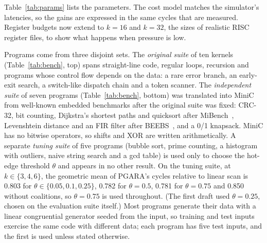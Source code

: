 \documentclass{ieeeaccess}
\newcommand{\MG}{PGARA}
\begin{document}
Table~\ref{tab:params} lists the parameters. The cost model matches the
simulator's latencies, so the gains are expressed in the same cycles
that are measured. Register budgets now extend to $k=16$ and $k=32$,
the sizes of realistic RISC register files, to show what happens when
pressure is low.

Programs come from three disjoint sets. The \emph{original suite} of
ten kernels (Table~\ref{tab:bench}, top) spans straight-line code,
regular loops, recursion and programs whose control flow depends on the
data: a rare error branch, an early-exit search, a switch-like dispatch
chain and a token scanner. The \emph{independent suite} of seven
programs (Table~\ref{tab:bench}, bottom) was translated into MiniC from
well-known embedded benchmarks after the original suite was fixed:
CRC-32, bit counting, Dijkstra's shortest paths and quicksort after
MiBench~\cite{guthaus2001mibench}, Levenshtein distance and an FIR
filter after BEEBS~\cite{pallister2013beebs}, and a 0/1 knapsack.
MiniC has no bitwise operators, so shifts and XOR are written
arithmetically. A separate \emph{tuning suite} of five programs (bubble
sort, prime counting, a histogram with outliers, naive string search and
a gcd table) is used only to choose the hot-edge threshold $\theta$ and
appears in no other result. On the tuning suite, at
$k\in\{3,4,6\}$, the geometric mean of \MG's cycles relative to linear
scan is 0.803 for $\theta\in\{0.05,0.1,0.25\}$, 0.782 for $\theta=0.5$,
0.781 for $\theta=0.75$ and 0.850 without coalitions, so $\theta=0.75$
is used throughout. (The first draft used $\theta=0.25$, chosen on the
evaluation suite itself.) Most programs generate their data with a
linear congruential generator seeded from the input, so training and
test inputs exercise the same code with different data; each program
has five test inputs, and the first is used unless stated otherwise.
\end{document}

